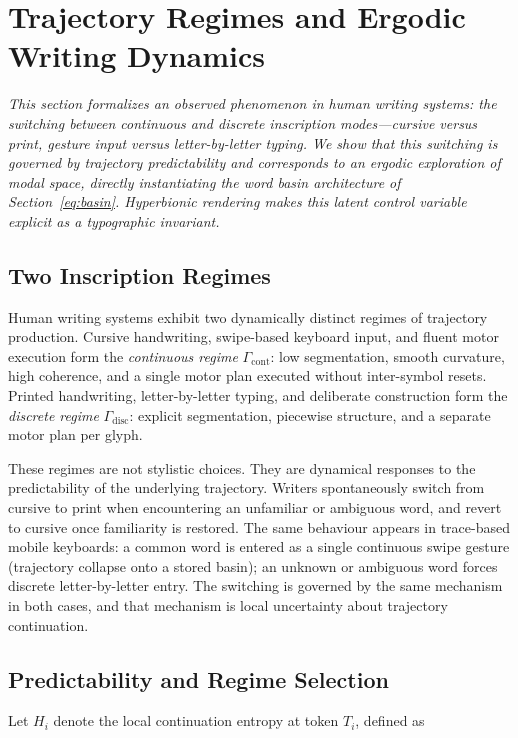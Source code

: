 \documentclass[12pt, a4paper]{article}
\begin{document}
\section{Trajectory Regimes and Ergodic Writing Dynamics}

\noindent\textit{This section formalizes an observed phenomenon in human writing systems: the switching between continuous and discrete inscription modes---cursive versus print, gesture input versus letter-by-letter typing. We show that this switching is governed by trajectory predictability and corresponds to an ergodic exploration of modal space, directly instantiating the word basin architecture of Section~\ref{eq:basin}. Hyperbionic rendering makes this latent control variable explicit as a typographic invariant.}

\subsection{Two Inscription Regimes}

Human writing systems exhibit two dynamically distinct regimes of trajectory production. Cursive handwriting, swipe-based keyboard input, and fluent motor execution form the \emph{continuous regime} $\Gamma_{\mathrm{cont}}$: low segmentation, smooth curvature, high coherence, and a single motor plan executed without inter-symbol resets. Printed handwriting, letter-by-letter typing, and deliberate construction form the \emph{discrete regime} $\Gamma_{\mathrm{disc}}$: explicit segmentation, piecewise structure, and a separate motor plan per glyph.

These regimes are not stylistic choices. They are dynamical responses to the predictability of the underlying trajectory. Writers spontaneously switch from cursive to print when encountering an unfamiliar or ambiguous word, and revert to cursive once familiarity is restored. The same behaviour appears in trace-based mobile keyboards: a common word is entered as a single continuous swipe gesture (trajectory collapse onto a stored basin); an unknown or ambiguous word forces discrete letter-by-letter entry. The switching is governed by the same mechanism in both cases, and that mechanism is local uncertainty about trajectory continuation.

\subsection{Predictability and Regime Selection}

Let $H_i$ denote the local continuation entropy at token $T_i$, defined as
\end{document}
